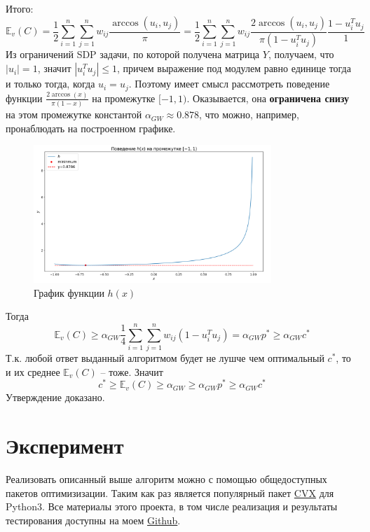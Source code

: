 \documentclass[12pt, a4paper]{article}
\newcommand{\Expect}{\mathbb{E}}
\begin{document}
Итого:
$$ \Expect_v (C) = \frac{1}{2} \sum_{i = 1}^{n} \sum_{j=1}^{n} w_{ij} \frac{\arccos(u_i, u_j)}{\pi} = \frac{1}{2} \sum_{i = 1}^{n} \sum_{j=1}^{n} w_{ij} \frac{2\arccos(u_i, u_j)}{\pi(1 - u_i^T u_j)} \frac{1 - u_i^T u_j}{1} $$
Из ограничений SDP задачи, по которой получена матрица $Y$, получаем, что $|u_i| = 1$, значит $|u_i^T u_j| \leqslant 1$, причем выражение под модулем равно единице тогда и только тогда, когда $u_i = u_j$. Поэтому имеет смысл рассмотреть поведение функции $\frac{2 \arccos (x)}{\pi (1 - x)}$ на промежутке $[-1, 1)$. Оказывается, она \textbf{ограничена снизу} на этом промежутке константой $\alpha_{GW} \approx 0.878$, что можно, например, пронаблюдать на построенном графике.

\begin{figure}[h]
\centering
\includegraphics[width=0.8\textwidth]{images/h.png}
\caption[width=0.8\textwidth]{График функции $h(x)$}
\label{fig:fig3}
\end{figure}

Тогда
$$ \Expect_v (C) \geqslant \alpha_{GW} \frac{1}{4} \sum_{i = 1}^{n} \sum_{j=1}^{n} w_{ij} (1 - u_i^T u_j) = \alpha_{GW} p^* \geqslant \alpha_{GW} c^*$$
Т.к. любой ответ выданный алгоритмом будет не лушче чем оптимальный $c^*$, то и их среднее $\Expect_v (C)$ -- тоже. Значит
$$c^* \geqslant \Expect_v (C) \geqslant \alpha_{GW} \geqslant \alpha_{GW} p^* \geqslant \alpha_{GW} c^*$$
Утверждение доказано.\\
\null \hfill \square

\section{Эксперимент}

Реализовать описанный выше алгоритм можно с помощью общедоступных пакетов оптимизизации. Таким как раз является популярный пакет \href{https://cvxopt.org}{CVX} для Python3. Все материалы этого проекта, в том числе реализация и результаты тестирования доступны на моем \href{https://github.com/rvg77/max-cut}{Github}.
\end{document}
